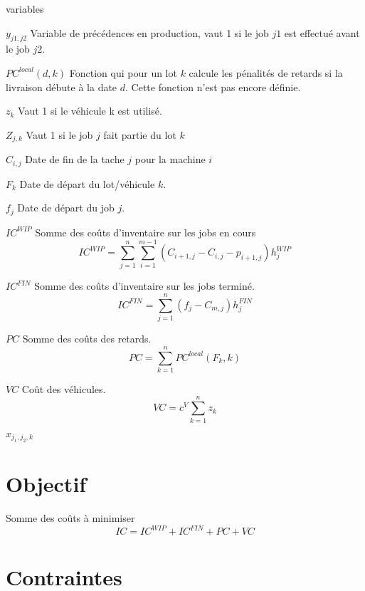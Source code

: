 \documentclass{article}
\begin{document}
        \begin{labeling}{variables}
            \item [$y_{j1,j2}$] Variable de précédences en production, vaut 1 si le job $j1$ est effectué avant le job $j2$. 
            \item [$PC^{local}\left(d,k\right)$] Fonction qui pour un lot $k$ calcule les pénalités de retards si la livraison débute à la date $d$. Cette fonction n’est pas encore définie.
            \item [$z_k$] Vaut 1 si le véhicule k est utilisé.
            \item [$Z_{j,k}$] Vaut 1 si le job $j$ fait partie du lot $k$
            \item [$C_{i,j}$] Date de fin de la tache $j$ pour la machine $i$
            \item [$F_k$] Date de départ du lot/véhicule $k$.
            \item [$f_j$] Date de départ du job $j$.
            \item [$IC^{WIP}$] Somme des coûts d’inventaire sur les jobs en cours
            $$IC^{WIP}=\sum_{j=1}^{n}\sum_{i=1}^{m-1}{\left(C_{i+1,j}-C_{i,j}-p_{i+1,j}\right)h_j^{WIP}}$$
            
            \item [$IC^{FIN}$] Somme des coûts d’inventaire sur les jobs terminé.
            $${IC}^{FIN}=\sum_{j=1}^{n}{\left(f_j-C_{m,j}\right)h_j^{FIN}}$$
            \item [$PC$] Somme des coûts des retards.
            $$PC=\sum_{k=1}^{n}{PC^{local}\left(F_k, k\right)}$$
            \item[$VC$] Coût des véhicules.
            $$VC=c^V\sum_{k=1}^{n}z_k$$
            
            \item
                [$x_{j_1,j_2,k}$]
                
            
        \end{labeling}
    
    
    \section*{Objectif}
        Somme des coûts à minimiser 
        $$IC=IC^{WIP}+IC^{FIN}+PC+VC$$
        
    
    \section*{Contraintes}
    
\end{document}
